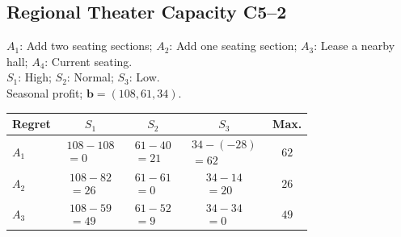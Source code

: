 {	\subsection{Regional Theater Capacity \hfill C5--2}
	\noindent\begin{minipage}[t]{0.48\textwidth}
		\vspace{0pt}
		$A_1$: Add two seating sections; $A_2$: Add one seating section;
		$A_3$: Lease a nearby hall; $A_4$: Current seating.\\
		$S_1$: High; $S_2$: Normal; $S_3$: Low.\\
		Seasonal profit; $\boldsymbol{b}=(108,61,34)$.
	\end{minipage}\hfill
	\begin{minipage}[t]{0.49\textwidth}
		\vspace{0pt}\centering
		\setlength{\tabcolsep}{3pt}
		\renewcommand{\arraystretch}{1.25}
		\begin{tabular}{lcccc}\toprule
				Regret & $S_1$ & $S_2$ & $S_3$ & Max.\\ \midrule
				$A_1$&$\begin{gathered}108-108\\=0\end{gathered}$&$\begin{gathered}61-40\\=21\end{gathered}$&$\begin{gathered}34-(-28)\\=62\end{gathered}$&$62$\\
				$A_2$&$\begin{gathered}108-82\\=26\end{gathered}$&$\begin{gathered}61-61\\=0\end{gathered}$&$\begin{gathered}34-14\\=20\end{gathered}$&$26$\\
				$A_3$&$\begin{gathered}108-59\\=49\end{gathered}$&$\begin{gathered}61-52\\=9\end{gathered}$&$\begin{gathered}34-34\\=0\end{gathered}$&$49$\\

\end{tabular}
\end{minipage}}
